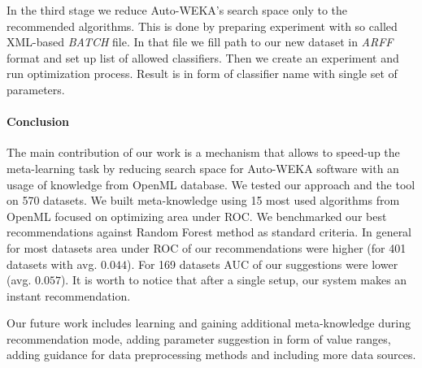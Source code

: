 \documentclass[a4paper]{llncs}
\let\oldparagraph\paragraph
\renewcommand{\paragraph}[1]{\oldparagraph{\textbf{#1}}}
\begin{document}
In the third stage we reduce Auto-WEKA's search space only to the recommended algorithms. This is done by preparing experiment with so called XML-based \emph{BATCH} file. In that file we fill path to our new dataset in \emph{ARFF} format and set up list of allowed classifiers. Then we create an experiment and run optimization process. Result is in form of classifier name with single set of parameters.

\vspace{-0.3em}

\paragraph{Conclusion}

The main contribution of our work is a mechanism that allows to speed-up the meta-learning task by reducing search space for Auto-WEKA software with an usage of knowledge from OpenML database. We tested our approach and the tool on 570 datasets. We built meta-knowledge using 15 most used algorithms from OpenML focused on optimizing area under ROC. We benchmarked our best recommendations against Random Forest method as standard criteria. In general for most datasets area under ROC of our recommendations were higher (for 401 datasets with avg. $0.044$). For 169 datasets AUC of our suggestions were lower (avg. $0.057$). It is worth to notice that after a single setup, our system makes an instant recommendation. 

Our future work includes learning and gaining additional meta-knowledge during recommendation mode, adding parameter suggestion in form of value ranges, adding guidance for data preprocessing methods and including more data sources.

\vspace{-1em}


{\small

}
\end{document}
